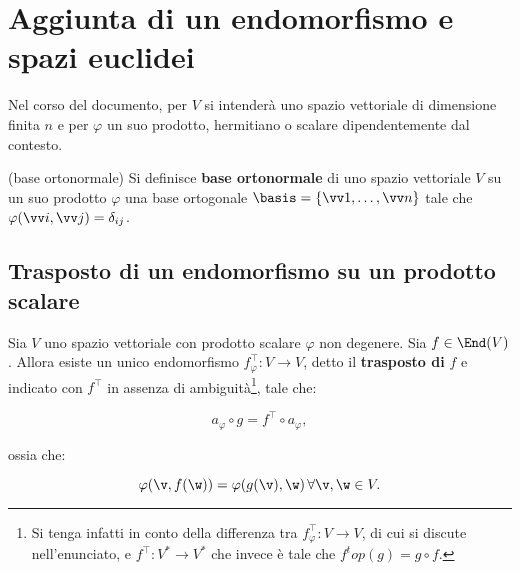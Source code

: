 \chapter{Aggiunta di un endomorfismo e spazi euclidei}

\begin{note}
	Nel corso del documento, per $V$ si intenderà uno spazio vettoriale di dimensione
	finita $n$ e per $\varphi$ un suo prodotto, hermitiano o scalare
	dipendentemente dal contesto.
\end{note}

\begin{definition} (base ortonormale)
	Si definisce \textbf{base ortonormale} di uno spazio vettoriale $V$ su un suo prodotto $\varphi$
	una base ortogonale $\basis = \{ \vv 1, \ldots, \vv n \}$ tale che $\varphi(\vv i, \vv j) = \delta_{ij}$.
\end{definition}

\section{Trasposto di un endomorfismo su un prodotto scalare}

\begin{proposition}
	Sia $V$ uno spazio vettoriale con prodotto scalare $\varphi$ non degenere.
	Sia $f \in \End(V)$. Allora esiste un unico endomorfismo
	$f_\varphi^\top : V \to V$, detto il \textbf{trasposto di} $f$ e indicato con $f^\top$ in assenza
	di ambiguità\footnote{Si tenga infatti in conto della differenza tra $f_\varphi^\top : V \to V$, di cui si discute
		nell'enunciato, e $f^\top : V^* \to V^*$ che invece è tale che $f^top(g) = g \circ f$.}, tale che:
	
	\[ a_\varphi \circ g = f^\top \circ a_\varphi, \]
	
	\vskip 0.05in
	
	ossia che:
	
	\[ \varphi(\v, f(\w)) = \varphi(g(\v), \w) \, \forall \v, \w \in V. \]
\end{proposition}

